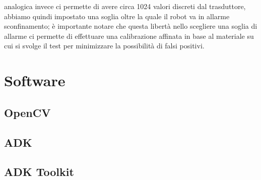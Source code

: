 analogica invece ci permette di avere circa 1024 valori discreti dal trasduttore, abbiamo quindi impostato una soglia oltre la quale il robot va in allarme sconfinamento; è importante notare che questa libertà nello scegliere una soglia di allarme ci permette di effettuare una calibrazione affinata in base al materiale su cui si svolge il test per minimizzare la possibilità di falsi positivi. 

\section{Software}
\subsection {OpenCV}
\subsection {ADK}
\subsection {ADK Toolkit}
